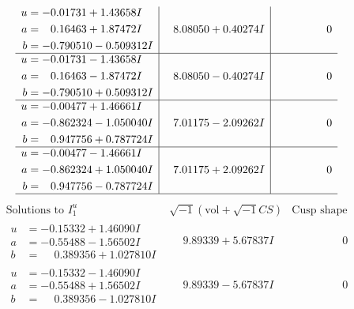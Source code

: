 \documentclass[1p]{elsarticle_modified}
\theoremstyle{definition}
\newcommand{\I}{\sqrt{-1}}
\begin{document}
$$\begin{array}{c|c|c}
\begin{aligned}
u &= -0.01731 + 1.43658 I \\
a &= \phantom{-}0.16463 + 1.87472 I \\
b &= -0.790510 - 0.509312 I\end{aligned}
 & \phantom{-}8.08050 + 0.40274 I & \phantom{-0.000000 } 0 \\ \hline\begin{aligned}
u &= -0.01731 - 1.43658 I \\
a &= \phantom{-}0.16463 - 1.87472 I \\
b &= -0.790510 + 0.509312 I\end{aligned}
 & \phantom{-}8.08050 - 0.40274 I & \phantom{-0.000000 } 0 \\ \hline\begin{aligned}
u &= -0.00477 + 1.46661 I \\
a &= -0.862324 - 1.050040 I \\
b &= \phantom{-}0.947756 + 0.787724 I\end{aligned}
 & \phantom{-}7.01175 - 2.09262 I & \phantom{-0.000000 } 0 \\ \hline\begin{aligned}
u &= -0.00477 - 1.46661 I \\
a &= -0.862324 + 1.050040 I \\
b &= \phantom{-}0.947756 - 0.787724 I\end{aligned}
 & \phantom{-}7.01175 + 2.09262 I & \phantom{-0.000000 } 0\\
 \hline 
 \end{array}$$\newpage$$\begin{array}{c|c|c}  
\text{Solutions to }I^u_{1}& \I (\text{vol} + \sqrt{-1}CS) & \text{Cusp shape}\\
 \hline 
\begin{aligned}
u &= -0.15332 + 1.46090 I \\
a &= -0.55488 - 1.56502 I \\
b &= \phantom{-}0.389356 + 1.027810 I\end{aligned}
 & \phantom{-}9.89339 + 5.67837 I & \phantom{-0.000000 } 0 \\ \hline\begin{aligned}
u &= -0.15332 - 1.46090 I \\
a &= -0.55488 + 1.56502 I \\
b &= \phantom{-}0.389356 - 1.027810 I\end{aligned}
 & \phantom{-}9.89339 - 5.67837 I & \phantom{-0.000000 } 0 \\ \hline\begin{aligned}

\end{aligned}
\end{array}$$
\end{document}
